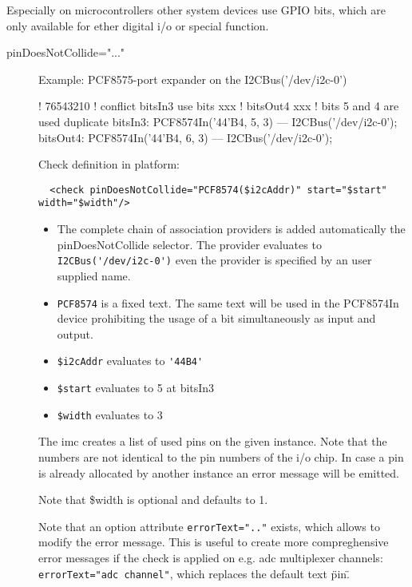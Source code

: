 Especially on microcontrollers other system devices use GPIO bits, which 
are only available for ether digital i/o or special function.

\begin{description}
\item[pinDoesNotCollide="..."]

Example: PCF8575-port expander on the I2CBus('/dev/i2c-0')
  \begin{PEARLCode}
  !                             76543210
  ! conflict bitsIn3 use bits     xxx
  !          bitsOut4            xxx
  ! bits 5 and 4 are used duplicate 
  bitsIn3:  PCF8574In('44'B4, 5, 3) --- I2CBus('/dev/i2c-0');
  bitsOut4: PCF8574In('44'B4, 6, 3) --- I2CBus('/dev/i2c-0');
  \end{PEARLCode}

  Check definition in platform:
  \begin{verbatim}
  <check pinDoesNotCollide="PCF8574($i2cAddr)" start="$start" width="$width"/>  
  \end{verbatim}
  \begin{itemize}
  \item The complete chain of association providers is added automatically
  the pinDoesNotCollide selector. 
  The provider evaluates to \verb|I2CBus('/dev/i2c-0')| even
  the provider is specified by an user supplied name.

  \item \verb|PCF8574| is a fixed text. The same text will be used in the PCF8574In
  device prohibiting the usage of a bit simultaneously as input and output.

  \item \verb|$i2cAddr| evaluates to \verb|'44B4'|

  \item \verb|$start| evaluates to  5 at bitsIn3 

  \item \verb|$width| evaluates to 3

  \end{itemize}

The imc creates a list of used pins on the given instance. 
Note that the numbers are not identical to the pin numbers of
the i/o chip. 
In case a pin is already allocated by another instance an error
message will be emitted.

Note that \$width is optional and defaults to 1.

Note that an option attribute \verb|errorText=".."| exists, which allows 
to modify the error message. This is useful to create more compreghensive 
error messages if the check is applied on e.g. adc multiplexer channels:
 \texttt{errorText="adc channel"}, which replaces the default text \"pin\".


\end{description}
